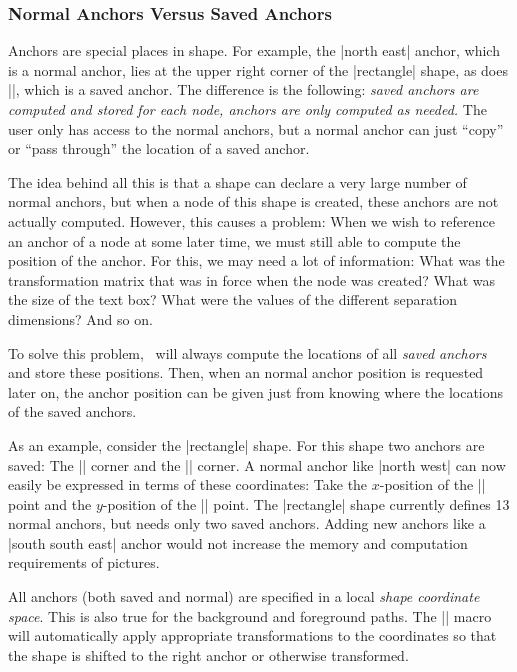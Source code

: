 \subsubsection{Normal Anchors Versus Saved Anchors}

Anchors  are special places in shape. For example, the |north east|
anchor, which is a normal anchor, lies at the upper right corner of
the  |rectangle| shape, as does |\northeast|, which is a saved
anchor. The difference is the following: \emph{saved anchors are
  computed and stored for each node, anchors are only computed as
  needed.} The user only has access to the normal anchors, but a
normal anchor can just ``copy'' or ``pass through'' the location of a
saved anchor.

The idea behind all this is that a shape can declare a very large
number of normal anchors, but when a node of this shape is created,
these anchors are not actually computed. However, this causes a
problem: When we wish to reference an anchor of a node at some later
time, we must still able to compute the position of the anchor. For
this, we may need a lot of information: What was the transformation
matrix that was in force when the node was created? What was the size
of the text box? What were the values of the different separation
dimensions? And so on.

To solve this problem, \pgfname\ will always compute the locations of
all \emph{saved anchors} and store these positions. Then, when an
normal anchor position is requested later on, the anchor position can
be given just from knowing where the locations of the saved anchors.

As an example, consider the |rectangle| shape. For this shape two
anchors are saved: The |\northeast| corner and the |\southwest|
corner. A normal anchor like |north west| can now easily be expressed
in terms of these coordinates: Take the $x$-position of the
|\southwest| point  and the $y$-position of the |\northeast| point.
The |rectangle| shape currently defines 13 normal anchors, but needs
only two saved anchors. Adding new anchors like a  |south south east|
anchor would not increase the memory and computation requirements of
pictures.

All anchors (both saved and normal) are specified in a local
\emph{shape coordinate space}. This is also true for the background
and foreground paths. The |\pgfnode| macro will automatically apply
appropriate transformations to the coordinates so that the shape is
shifted to the right anchor or otherwise transformed.


